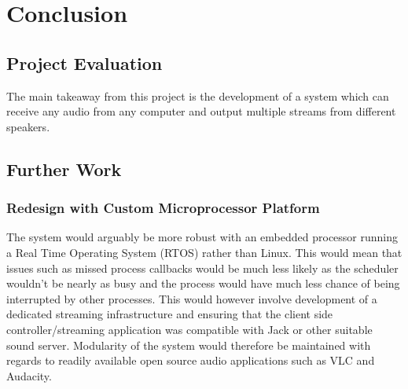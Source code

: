 \documentclass[main.tex]{subfiles}
\begin{document}
\chapter{Conclusion}
\section{Project Evaluation}
The main takeaway from this project is the development of a system which can receive any audio from any computer and output multiple streams from different speakers.

\section{Further Work}
\subsection{Redesign with Custom Microprocessor Platform}
The system would arguably be more robust with an embedded processor running a Real Time Operating System (RTOS) rather than Linux. 
This would mean that issues such as missed process callbacks would be much less likely as the scheduler wouldn't be nearly as busy and the process would have much less chance of being interrupted by other processes.
This would however involve development of a dedicated streaming infrastructure and ensuring that the client side controller/streaming application was compatible with Jack or other suitable sound server.
Modularity of the system would therefore be maintained with regards to readily available open source audio applications such as VLC and Audacity.
\end{document}
